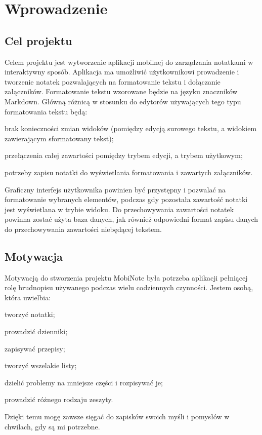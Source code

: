 \documentclass[shortabstract]{iithesis}
\author         {Bartosz Sobocki}
\begin{document}

\chapter{Wprowadzenie}

\section{Cel projektu}

Celem projektu jest wytworzenie aplikacji mobilnej do zarządzania notatkami w interaktywny sposób.
Aplikacja ma umożliwić użytkownikowi prowadzenie i tworzenie notatek pozwalających na formatowanie tekstu i dołączanie załączników.
Formatowanie tekstu wzorowane będzie na języku znaczników Markdown. Główną różnicą w stosunku do edytorów używających tego typu formatowania tekstu będą:
\begin{compactitem}
    \item brak konieczności zmian widoków (pomiędzy edycją surowego tekstu, a widokiem zawierającym sformatowany tekst);
    \item przełączenia całej zawartości pomiędzy trybem edycji, a trybem użytkowym;
    \item potrzeby zapisu notatki do wyświetlania formatowania i zawartych załączników.
\end{compactitem}

Graficzny interfejs użytkownika powinien być przystępny i pozwalać na formatowanie wybranych elementów, podczas gdy pozostała zawartość notatki jest wyświetlana w trybie widoku.
Do przechowywania zawartości notatek powinna zostać użyta baza danych, jak również odpowiedni format zapisu danych do przechowywania zawartości niebędącej tekstem.

\section{Motywacja}

Motywacją do stworzenia projektu MobiNote była potrzeba aplikacji pełniącej rolę brudnopisu używanego podczas wielu codziennych czynności. Jestem osobą, która uwielbia:

\begin{compactitem}
    \item tworzyć notatki;
    \item prowadzić dzienniki;
    \item zapisywać przepisy;
    \item tworzyć wszelakie listy;
    \item dzielić problemy na mniejsze części i rozpisywać je;
    \item  prowadzić różnego rodzaju zeszyty.
\end{compactitem}
Dzięki temu mogę zawsze sięgać do zapisków swoich myśli i pomysłów w chwilach, gdy są mi potrzebne.
\end{document}
